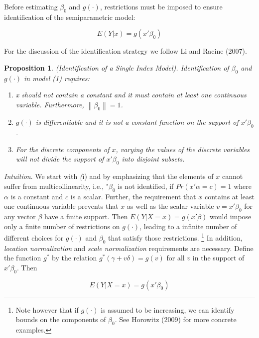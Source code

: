 \documentclass[a4paper]{article}
\newcommand{\norm}[1]{\left\lVert#1\right\rVert}
\begin{document}
Before estimating  $\beta_0$ and $ g(\cdot)$, restrictions must be imposed to ensure identification of the  semiparametric model:

\[E(Y|x) = g(x'\beta_0) \]

\vspace{5mm} 

For the discussion of the identification strategy we follow Li and Racine (2007).


\newtheorem{prop}{Proposition}

\begin{prop}
(Identification of a Single Index Model). 
Identification of $\beta_0$ and $g(\cdot)$ in model (1) requires:
\begin{enumerate}[label=(\roman*)]
\item x should not contain a constant and it must contain at least one continuous variable. Furthermore, $\norm{ \beta_0 } = 1$.
\item $g(\cdot)$ is differentiable and it is not a constant function on the support of $x'\beta_0$.
\item For the discrete components of $x$, varying the values of the discrete variables will not divide the support of $x'\beta_0$ into disjoint subsets.
\end{enumerate}
\end{prop}


\textit{Intuition}. We start with \textit(i) and by emphasizing that the elements of $x$ cannot suffer from multicollinearity, i.e., "$\beta_0$ is not identified, if $Pr(x'\alpha = c)=1$ where $\alpha$ is a constant and $c$ is a scalar. Further, the requirement that $x$ contains at least one continuous variable prevents that $x$ as well as the scalar variable $ v = x'\beta_0$ for any vector $\beta$ have a finite support. Then $E(Y|X = x) = g(x'\beta)$ would impose only a finite number of restrictions  on $g(\cdot)$, leading to a infinite number of different choices for $g(\cdot)$ and $\beta_0$ that satisfy those restrictions. \footnote{Note however that if $g(\cdot)$ is assumed to be increasing, we can identify bounds on the components of $\beta_0$. See Horowitz (2009) for more concrete examples.} In addition, \textit{location normalization} and \textit{scale normalization} requirements are necessary. Define the function $g^*$ by the relation $g^*(\gamma + v\delta) = g(v)$ for all $v$ in the support of $x'\beta_0$. Then

\begin{equation}
E(Y|X = x) = g(x'\beta_0)
\end{equation}
\end{document}
